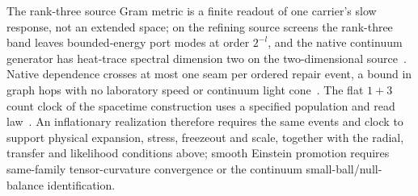 \documentclass[11pt]{article}
\theoremstyle{remark}
\theoremstyle{plain}
\begin{document}
The rank-three source Gram metric is a finite readout of one carrier's slow
response, not an extended space; on the refining source screens the
rank-three band leaves bounded-energy port modes at order \(2^{-l}\), and the
native continuum generator has heat-trace spectral dimension two on the
two-dimensional source~\cite{ophmodel,ophcontinuum}. Native dependence
crosses at most one seam per ordered repair event, a bound in graph hops
with no laboratory speed or continuum light cone~\cite{ophcausality}. The
flat \(1+3\) count clock of the spacetime construction uses a specified
population and read law~\cite{ophEinstein}. An inflationary realization
therefore requires the same events and clock to support physical expansion,
stress, freezeout and scale, together with the radial, transfer and
likelihood conditions above; smooth Einstein promotion requires same-family
tensor-curvature convergence or the continuum small-ball/null-balance
identification.
\end{document}
